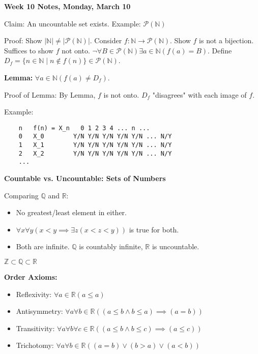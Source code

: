 \documentclass{article}
\begin{document}
\fontsize{6pt}{7pt}\selectfont %

\begin{multicols}{3} %

\textbf{Week 10 Notes, Monday, March 10}

\noindent
Claim: An uncountable set exists. Example: $\mathcal{P}(\mathbb{N})$

\noindent
Proof: Show $|\mathbb{N}| \neq |\mathcal{P}(\mathbb{N})|$. Consider $f: \mathbb{N} \to \mathcal{P}(\mathbb{N})$. Show $f$ is not a bijection. Suffices to show $f$ not onto.  $\neg \forall B \in \mathcal{P}(\mathbb{N}) \exists a \in \mathbb{N} (f(a) = B)$. Define $D_f = \{n \in \mathbb{N} \mid n \notin f(n)\} \in \mathcal{P}(\mathbb{N})$.

\noindent
\textbf{Lemma:} $\forall a \in \mathbb{N} (f(a) \neq D_f)$.

\noindent
Proof of Lemma: By Lemma, $f$ is not onto. $D_f$ "disagrees" with each image of $f$.

\noindent
Example:
\begin{verbatim}
    n   f(n) = X_n   0 1 2 3 4 ... n ...
    0   X_0        Y/N Y/N Y/N Y/N Y/N ... N/Y
    1   X_1        Y/N Y/N Y/N Y/N Y/N ... N/Y
    2   X_2        Y/N Y/N Y/N Y/N Y/N ... N/Y
    ...
\end{verbatim}

\noindent
\textbf{Countable vs. Uncountable: Sets of Numbers}

\noindent
Comparing $\mathbb{Q}$ and $\mathbb{R}$:

\begin{itemize}[noitemsep,nolistsep,leftmargin=*,label=$\bullet$]
    \item No greatest/least element in either.
    \item $\forall x \forall y (x < y \implies \exists z (x < z < y))$ is true for both.
    \item Both are infinite. $\mathbb{Q}$ is countably infinite, $\mathbb{R}$ is uncountable.
\end{itemize}

\noindent
$\mathbb{Z} \subset \mathbb{Q} \subset \mathbb{R}$

\noindent
\textbf{Order Axioms:}
\begin{itemize}[noitemsep,nolistsep,leftmargin=*,label=$\bullet$]
    \item Reflexivity: $\forall a \in \mathbb{R} (a \le a)$
    \item Antisymmetry: $\forall a \forall b \in \mathbb{R} ((a \le b \land b \le a) \implies (a = b))$
    \item Transitivity: $\forall a \forall b \forall c \in \mathbb{R} ((a \le b \land b \le c) \implies (a \le c))$
    \item Trichotomy: $\forall a \forall b \in \mathbb{R} ((a = b) \lor (b > a) \lor (a < b))$
\end{itemize}


\end{multicols}
\end{document}
